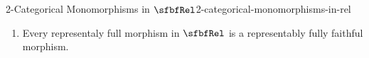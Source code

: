 \begin{proposition}{2-Categorical Monomorphisms in $\sfbfRel$}{2-categorical-monomorphisms-in-rel}
\begin{enumerate}
\begin{enumerate}
                \item\label{2-categorical-monomorphisms-in-rel-representably-full-morphisms-in-rel-5}The functor
                    \[
                        R_{!}%
                        \colon%
                        (\mathcal{P}(A),\subset)%
                        \to%
                        (\mathcal{P}(B),\subset)%
                    \]%
                    is full.
                \item\label{2-categorical-monomorphisms-in-rel-representably-full-morphisms-in-rel-6}For each $U,V\in\mathcal{P}(A)$, if $R_{!}(U)\subset R_{!}(V)$, then $U\subset V$.
            \end{enumerate}
        \item\label{2-categorical-monomorphisms-in-rel-representably-fully-faithful-morphisms-in-rel}Every representaly full morphism in $\sfbfRel$ is a representably fully faithful morphism.
    \end{enumerate}
\end{proposition}
